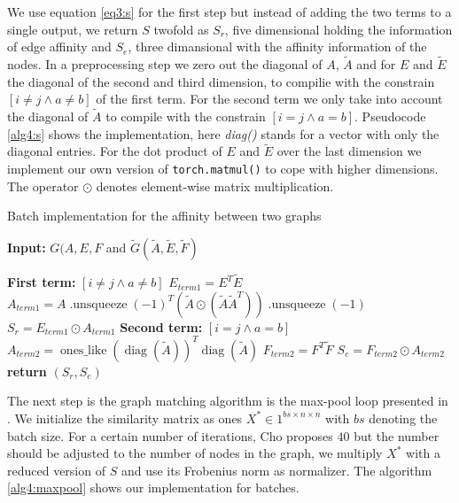 We use equation \ref{eq3:s} for the first step but instead of adding the two terms to a single output, we return $S$ twofold as $S_r$, five dimensional holding the information of edge affinity and $S_e$, three dimansional with the affinity information of the nodes. In a preprocessing step we zero out the diagonal of $A$, $\tilde{A}$ and for $E$ and $\tilde{E}$ the diagonal of the second and third dimension, to compilie with the constrain $[i \neq j \wedge a \neq b]$ of the first term. For the second term we only take into account the diagonal of $\tilde{A}$ to compile with the constrain $[i=j \wedge a=b]$. Pseudocode \ref{alg4:s} shows the implementation, here \textit{diag()} stands for a vector with only the diagonal entries. For the dot product of $E$ and $\tilde{E}$ over the last dimension we implement our own version of \texttt{torch.matmul()} to cope with higher dimensions. The operator $\odot$ denotes element-wise matrix multiplication.



\begin{algorithm}
    \caption{Batch implementation for the affinity between two graphs }
    \hspace*{\algorithmicindent} \textbf{Input:} $G(A,E,F$ and $\tilde{G}(\tilde{A},\tilde{E},\tilde{F})$
    \begin{algorithmic}[1]
        \Statex \textbf{First term:} $[i \neq j \wedge a \neq b]$
        \State $E_{term1} = E^T  \tilde{E}$ 
        \State $A_{term1} = A\operatorname{.unsqueeze}(-1)^T (\tilde{A} \odot (\tilde{A}  \tilde{A}^T))\operatorname{.unsqueeze}(-1)$ 
        \State $S_r = E_{term1} \odot A_{term1}$
        \Statex \textbf{Second term:} $[i=j \wedge a=b]$
        \State $A_{term2} = \operatorname{ones\_like}(\operatorname{diag}(\tilde{A}))^T \operatorname{diag}(\tilde{A})$
        \State $F_{term2} = F^T  \tilde{F}$ 
        \State $S_e = F_{term2} \odot A_{term2}$
        \State \textbf{return} $(S_r, S_e)$
    \end{algorithmic}
    \label{alg4:s}
\end{algorithm}


The next step is the graph matching algorithm is the max-pool loop presented in \cite{cho_finding_2014}. We initialize the similarity matrix as ones $X^* \in 1^{bs\times n \times n}$ with $bs$ denoting the batch size. For a certain number of iterations, Cho proposes $40$ but the number should be adjusted to the number of nodes in the graph, we multiply $X^*$ with a reduced version of $S$ and use its Frobenius norm as normalizer. The algorithm \ref{alg4:maxpool} shows our implementation for batches.


